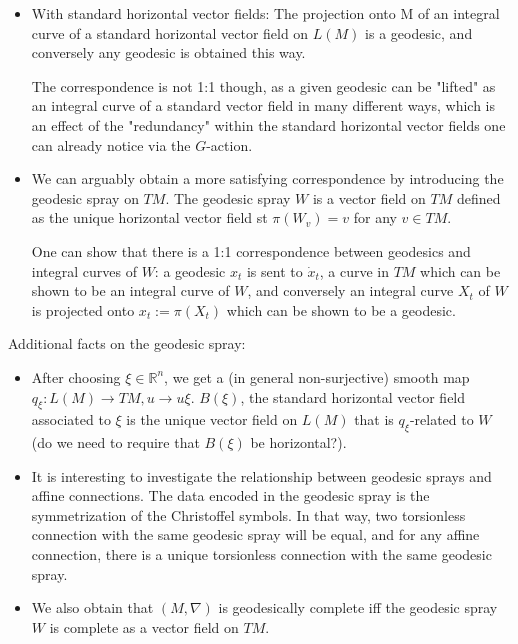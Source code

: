 \documentclass{report}
\theoremstyle{definition}
\begin{document}
\begin{itemize}
    \item With standard horizontal vector fields: The projection onto M of an integral curve of a standard horizontal vector field on $L(M)$ is a geodesic, and conversely any geodesic is obtained this way.

    The correspondence is not 1:1 though, as a given geodesic can be "lifted" as an integral curve of a standard vector field in many different ways, which is an effect of the "redundancy" within the standard horizontal vector fields one can already notice via the $G$-action.
    \item We can arguably obtain a more satisfying correspondence by introducing the geodesic spray on $TM$. The geodesic spray $W$ is a vector field on $TM$ defined as the unique horizontal vector field st $\pi(W_v)=v$ for any $v\in TM$.

    One can show that there is a 1:1 correspondence between geodesics and integral curves of $W$: a geodesic $x_t$ is sent to $\dot{x}_t$, a curve in $TM$ which can be shown to be an integral curve of $W$, and conversely an integral curve $X_t$ of $W$ is projected onto $x_t:=\pi(X_t)$ which can be shown to be a geodesic.
\end{itemize}

Additional facts on the geodesic spray:
\begin{itemize}
    \item After choosing $\xi\in\mathbb{R}^n$, we get a (in general non-surjective) smooth map $q_{\xi}:L(M)\to TM,u\to u\xi$. $B(\xi)$, the standard horizontal vector field associated to $\xi$ is the unique vector field on $L(M)$ that is $q_{\xi}$-related to $W$ (do we need to require that $B(\xi)$ be horizontal?).

    \item It is interesting to investigate the relationship between geodesic sprays and affine connections. The data encoded in the geodesic spray is the symmetrization of the Christoffel symbols. In that way, two torsionless connection with the same geodesic spray will be equal, and for any affine connection, there is a unique torsionless connection with the same geodesic spray.

    \item We also obtain that $(M,\nabla)$ is geodesically complete iff the geodesic spray $W$ is complete as a vector field on $TM$.
    
\end{itemize}
\end{document}
